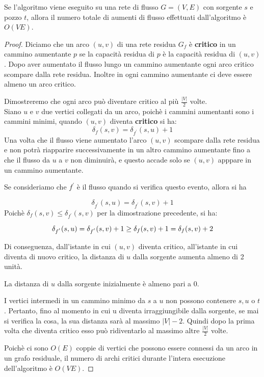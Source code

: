 \begin{minipage}{\textwidth}
    \begin{myblockquote}
        \begin{theorem}
            Se l'algoritmo viene eseguito su una rete di flusso $G = (V, E)$ con
            sorgente $s$ e pozzo $t$, allora il numero totale di aumenti di flusso
            effettuati dall'algoritmo è $O(VE)$.
        \end{theorem}
    \end{myblockquote}
\end{minipage}

\begin{proof}
    Diciamo che un arco $(u,v)$ di una rete residua $G_f$ è \textbf{critico} in un
    cammino aumentante $p$ se la capacità residua di $p$ è la capacità residua di
    $(u,v)$. Dopo aver aumentato il flusso lungo un cammino aumentante ogni arco
    critico scompare dalla rete residua. Inoltre in ogni cammino aumentante ci deve
    essere almeno un arco critico.

    Dimostreremo che ogni arco può diventare critico al più $\frac{|V|}{2}$ volte.\\

    Siano $u$ e $v$ due vertici collegati da un arco, poichè i cammini aumentanti
    sono i cammini minimi, quando $(u,v)$ diventa \textbf{critico} si ha:
    $$
        \delta_f(s,v) = \delta_{f^{'}}(s,u) +1
    $$
    Una volta che il flusso viene aumentato l'arco $(u,v)$ scompare dalla rete
    residua e non potrà riapparire successivamente in un altro cammino aumentante
    fino a che il flusso da $u$ a $v$ non diminuirà, e questo accade solo se $(u,v)$
    apppare in un cammino aumentante.

    Se consideriamo che $f^{'}$ è il flusso quando si verifica questo evento, allora
    si ha

    $$
        \delta_{f^{'}}(s,u) = \delta_{f^{'}}(s,v) +1
    $$
    Poichè $\delta_f(s,v) \le \delta_{f^{'}}(s,v)$ per la dimostrazione precedente,
    si ha:

    $$
        \delta_{f^{'}}(s,u) =  \delta_{f^{'}}(s,v) + 1 \\
        \ge \delta_f(s,v) + 1
        = \delta_f(s,v) +2
    $$


    Di conseguenza, dall'istante in cui $(u,v)$ diventa critico, all'istante in cui
    diventa di nuovo critico, la distanza di $u$ dalla sorgente aumenta almeno di 2
    unità.

    La distanza di $u$ dalla sorgente inizialmente è almeno pari a 0.

    I vertici intermedi in un cammino minimo da $s$ a $u$ non possono contenere $s,
        u$ o $t$. Pertanto, fino al momento in cui u diventa irraggiungibile dalla
    sorgente, se mai si verifica la cosa, la sua distanza sarà al massimo $|V| -2$.
    Quindi dopo la prima volta che diventa critico esso può ridiventarlo al massimo
    altre $\frac{|V|}{2}$ volte.

    Poichè ci sono $O(E)$ coppie di vertici che possono essere connessi da un arco
    in un grafo residuale, il numero di archi critici durante l'intera esecuzione
    dell'algoritmo è  $O(VE)$.
\end{proof}

